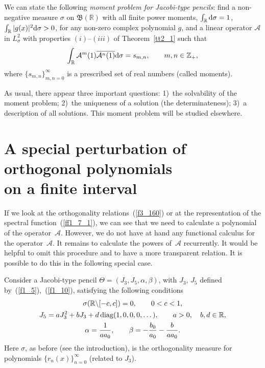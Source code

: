 \documentclass[pdftex]{sigma}
\numberwithin{equation}{section}
\begin{document}
We can state the following \textit{moment problem for Jacobi-type pencils}: f\/ind a non-negative measure $\sigma$ on $\mathfrak{B}(\mathbb{R})$ with all f\/inite power moments, $\int_\mathbb{R} {\rm d}\sigma = 1$, $\int_\mathbb{R} |g(x)|^2 {\rm d}\sigma > 0$, for any non-zero complex polynomial $g$, and a linear operator $\mathcal{A}$ in $L^2_\sigma$ with properties $(i)$--$(iii)$ of Theorem~\ref{tt2_1} such that
 \begin{gather*} \int_{\mathbb{R}} \mathcal{A}^m(1) \overline{ \mathcal{A}^n(1) } {\rm d}\sigma = s_{m,n},\qquad m,n\in\mathbb{Z}_+, \end{gather*}
where $\{ s_{m,n} \}_{m,n=0}^\infty$ is a prescribed set of real numbers (called moments).

As usual, there appear three important questions: 1)~the solvability of the moment problem; 2)~the uniqueness of a solution (the determinateness); 3)~a description of all solutions. This moment problem will be studied elsewhere.

\section[A special perturbation of orthogonal polynomials on a f\/inite interval]{A special perturbation of orthogonal polynomials \\ on a f\/inite interval}

If we look at the orthogonality relations~(\ref{f3_160}) or at the representation of the spectral function~(\ref{ff1_7_1}), we can see that we need to calculate a polynomial of the operator~$\mathcal{A}$. However, we do not have at hand any functional calculus for the operator~$\mathcal{A}$. It remains to calculate the powers of~$\mathcal{A}$ recurrently. It would be helpful to omit this procedure and to have a more transparent relation. It is possible to do this in the following special case.

Consider a Jacobi-type pencil $\Theta = (J_3,J_5,\alpha,\beta)$, with $J_3$, $J_5$ def\/ined by~(\ref{f1_5}),~(\ref{f1_10}), satisfying the following conditions
\begin{gather}
\sigma(\mathbb{R}\backslash[-c,c]) = 0,\qquad 0<c<1, \label{ff3_5} \\
J_5 = a J_3^2 + b J_3 + d \operatorname{diag} (1,0,0,0,\dots ),\qquad a>0,\quad b,d\in\mathbb{R}, \notag \\
\alpha = \frac{1}{a a_0},\qquad \beta = -\frac{b_0}{a_0} - \frac{b}{a a_0}. \label{ff3_15}
\end{gather}
Here $\sigma$, as before (see the introduction), is the orthogonality measure for polynomials $\{ r_n(x) \}_{n=0}^\infty$ (related to $J_3$).
\end{document}
